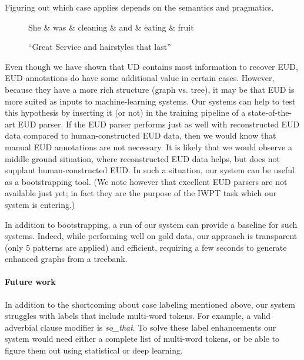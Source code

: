 \documentclass[11pt,a4paper]{article}
\begin{document}
\begin{itemize}
  Figuring out which case applies depends on the semantics and
  pragmatics.

\begin{figure}[h]
    \centering
    \begin{dependency}
    \begin{deptext}[column sep=0.1cm]
    She \& was \& cleaning \& and \& eating \& fruit  \\
    \end{deptext}
    \end{dependency}
    \caption{``Great Service and hairstyles that last''}
    \label{fig:conj-obj}
\end{figure}
 

\end{itemize}

Even though we have shown that UD contains most information to recover
EUD, EUD annotations do have some additional value in certain
cases. However, because they have a more rich structure (graph
vs. tree), it may be that EUD is more suited as inputs to
machine-learning systems. Our systems can help to test this hypothesis
by inserting it (or not) in the training pipeline of a state-of-the-art EUD
parser. If the EUD parser performs just as well with reconstructed EUD
data compared to human-constructed EUD data, then we would know that
manual EUD annotations are not necessary.  It is likely that we would observe
a middle ground situation, where reconstructed EUD data helps, but
does not supplant human-constructed EUD. In such a situation, our
system can be useful as a bootstrapping tool. (We note however that
excellent EUD parsers are not available just yet; in fact they are the
purpose of the IWPT task which our system is entering.)

In addition to bootstrapping, a run of our system can provide a
baseline for such systems.  Indeed, while performing well on gold
data, our approach is transparent (only 5 patterns are applied) and
efficient, requiring a few seconds to generate enhanced graphs from a
treebank. 

\paragraph{ Future work }

In addition to the shortcoming about case labeling mentioned above,
our system struggles with labels that include multi-word tokens. For
example, a valid adverbial clause modifier is \textit{so\_that}. To
solve these label enhancements our system would need either a complete
list of multi-word tokens, or be able to figure them out using
statistical or deep learning.
\end{document}
